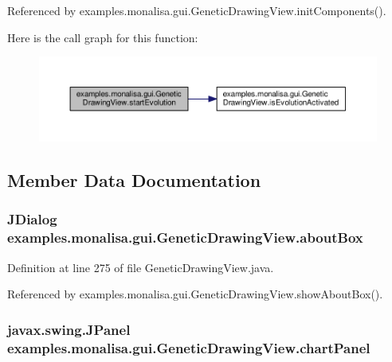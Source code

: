 Referenced by examples.\-monalisa.\-gui.\-Genetic\-Drawing\-View.\-init\-Components().



Here is the call graph for this function\-:
\nopagebreak
\begin{figure}[H]
\begin{center}
\leavevmode
\includegraphics[width=350pt]{classexamples_1_1monalisa_1_1gui_1_1_genetic_drawing_view_aa9f0d9afbfe61ecea4808ca6a1d33cac_cgraph}
\end{center}
\end{figure}




\subsection{Member Data Documentation}
\hypertarget{classexamples_1_1monalisa_1_1gui_1_1_genetic_drawing_view_a44e08f004a5cde193b3acf3400a79725}{
\subsubsection[{about\-Box}]{\setlength{\rightskip}{0pt plus 5cm}J\-Dialog examples.\-monalisa.\-gui.\-Genetic\-Drawing\-View.\-about\-Box\hspace{0.3cm}{\ttfamily [private]}}}\label{classexamples_1_1monalisa_1_1gui_1_1_genetic_drawing_view_a44e08f004a5cde193b3acf3400a79725}


Definition at line 275 of file Genetic\-Drawing\-View.\-java.



Referenced by examples.\-monalisa.\-gui.\-Genetic\-Drawing\-View.\-show\-About\-Box().

\hypertarget{classexamples_1_1monalisa_1_1gui_1_1_genetic_drawing_view_ab5b7170c87617ee05a1f3d2d9dc3b7e1}{
\subsubsection[{chart\-Panel}]{\setlength{\rightskip}{0pt plus 5cm}javax.\-swing.\-J\-Panel examples.\-monalisa.\-gui.\-Genetic\-Drawing\-View.\-chart\-Panel\hspace{0.3cm}{\ttfamily [private]}}}\label{classexamples_1_1monalisa_1_1gui_1_1_genetic_drawing_view_ab5b7170c87617ee05a1f3d2d9dc3b7e1}


